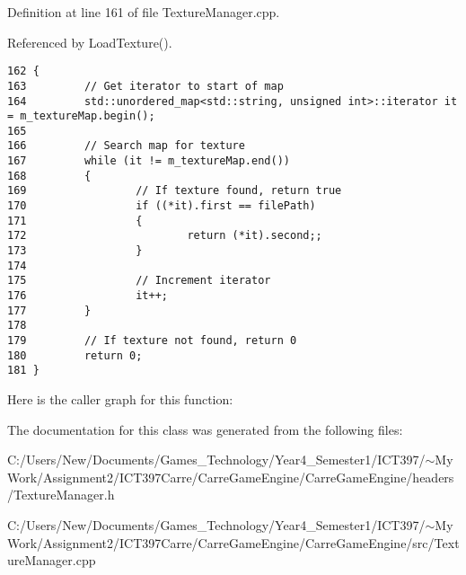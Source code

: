 Definition at line 161 of file TextureManager.cpp.

Referenced by LoadTexture().

\begin{Code}\begin{verbatim}162 {
163         // Get iterator to start of map
164         std::unordered_map<std::string, unsigned int>::iterator it = m_textureMap.begin();
165 
166         // Search map for texture
167         while (it != m_textureMap.end())
168         {
169                 // If texture found, return true
170                 if ((*it).first == filePath)
171                 {
172                         return (*it).second;;
173                 }
174 
175                 // Increment iterator
176                 it++;
177         }
178 
179         // If texture not found, return 0
180         return 0;
181 }\end{verbatim}
\end{Code}




Here is the caller graph for this function:

The documentation for this class was generated from the following files:\begin{CompactItemize}
\item 
C:/Users/New/Documents/Games\_\-Technology/Year4\_\-Semester1/ICT397/$\sim$My Work/Assignment2/ICT397Carre/CarreGameEngine/CarreGameEngine/headers/TextureManager.h\item 
C:/Users/New/Documents/Games\_\-Technology/Year4\_\-Semester1/ICT397/$\sim$My Work/Assignment2/ICT397Carre/CarreGameEngine/CarreGameEngine/src/TextureManager.cpp\end{CompactItemize}

